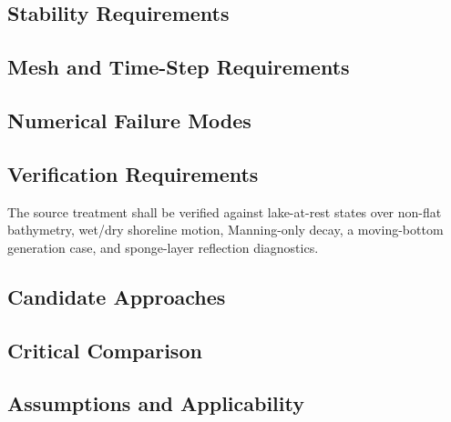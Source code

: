\subsection{Stability Requirements}
\label{sec:res-num-src-stability-requirements}


\subsection{Mesh and Time-Step Requirements}
\label{sec:res-num-src-mesh-time-step-requirements}


\subsection{Numerical Failure Modes}
\label{sec:res-num-src-numerical-failure-modes}


\subsection{Verification Requirements}
\label{sec:res-num-src-verification-requirements}

The source treatment shall be verified against lake-at-rest states over
non-flat bathymetry, wet/dry shoreline motion, Manning-only decay, a
moving-bottom generation case, and sponge-layer reflection diagnostics.

\subsection{Candidate Approaches}
\label{sec:res-num-src-candidate-approaches}


\subsection{Critical Comparison}
\label{sec:res-num-src-critical-comparison}


\subsection{Assumptions and Applicability}
\label{sec:res-num-src-assumptions}

